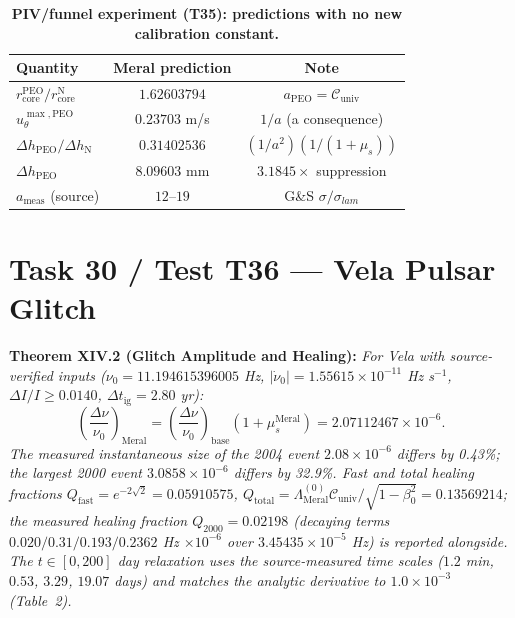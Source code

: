 \documentclass[12pt,a4paper]{article}
\begin{document}
\begin{table}[!htbp]
\centering\footnotesize
\setlength{\tabcolsep}{3pt}
\caption{\textbf{PIV/funnel experiment (T35): predictions with no new calibration constant.}}
\label{tab:piv}
\vspace{0.1cm}
\begin{tabular}{@{}l|c|c@{}}
\toprule
Quantity & Meral prediction & Note \\
\midrule
$r_{\mathrm{core}}^{\mathrm{PEO}}/r_{\mathrm{core}}^{\mathrm{N}}$ & $1.62603794$ & $a_{\mathrm{PEO}}=\mathcal{C}_{\mathrm{univ}}$ \\
$u_\theta^{\max,\mathrm{PEO}}$ & $0.23703$ m/s & $1/a$ (a consequence) \\
$\Delta h_{\mathrm{PEO}}/\Delta h_{\mathrm{N}}$ & $0.31402536$ & $(1/a^2)(1/(1+\mu_s))$ \\
$\Delta h_{\mathrm{PEO}}$ & $8.09603$ mm & $3.1845\times$ suppression \\
$a_{\mathrm{meas}}$ (source) & $12$--$19$ & G\&S $\sigma/\sigma_{lam}$ \\
\bottomrule
\end{tabular}
\end{table}

\section{Task 30 / Test T36 --- Vela Pulsar Glitch}

\textbf{Theorem XIV.2 (Glitch Amplitude and Healing):} \textit{For Vela with
source-verified inputs ($\nu_0=11.194615396005$ Hz,
$|\dot\nu_0|=1.55615\times 10^{-11}$ Hz s$^{-1}$,
$\Delta I/I \ge 0.0140$, $\Delta t_{\mathrm{ig}}=2.80$ yr):}
\begin{equation}
\boxed{\left(\frac{\Delta\nu}{\nu_0}\right)_{\mathrm{Meral}}
=\left(\frac{\Delta\nu}{\nu_0}\right)_{\mathrm{base}}
(1+\mu_s^{\mathrm{Meral}})=2.07112467\times 10^{-6}.}
\end{equation}
\textit{The measured instantaneous size of the 2004 event
$2.08\times 10^{-6}$ differs by 0.43\%; the largest 2000 event
$3.0858\times 10^{-6}$ differs by 32.9\%. Fast and total healing fractions
$Q_{\mathrm{fast}}=e^{-2\sqrt{2}}=0.05910575$,
$Q_{\mathrm{total}}=\Lambda_{\mathrm{Meral}}^{(0)}\mathcal{C}_{\mathrm{univ}}/
\sqrt{1-\beta_0^2}=0.13569214$; the measured healing fraction
$Q_{2000}=0.02198$ (decaying terms $0.020/0.31/0.193/0.2362$ Hz
$\times 10^{-6}$ over $3.45435\times 10^{-5}$ Hz) is reported alongside.
The $t\in[0,200]$ day relaxation uses the source-measured time scales
($1.2$ min, $0.53$, $3.29$, $19.07$ days) and matches the analytic
derivative to $1.0\times 10^{-3}$ (Table~2).}
\end{document}
